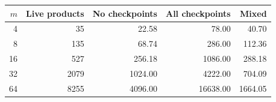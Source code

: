 \begin{tabular}{rrrrr}
\toprule
$m$ & Live products & No checkpoints & All checkpoints & Mixed\\
\midrule
4 & 35 & 22.58 & 78.00 & 40.70\\
8 & 135 & 68.74 & 286.00 & 112.36\\
16 & 527 & 256.18 & 1086.00 & 288.18\\
32 & 2079 & 1024.00 & 4222.00 & 704.09\\
64 & 8255 & 4096.00 & 16638.00 & 1664.05\\
\bottomrule
\end{tabular}
